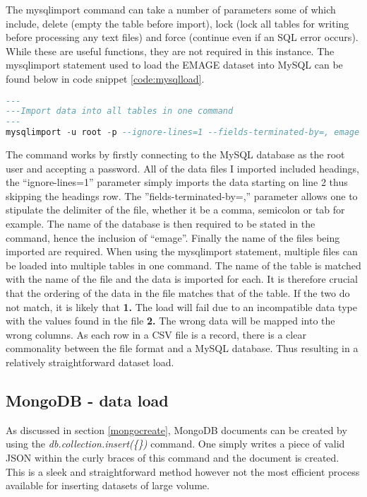 The mysqlimport command can take a number of parameters some of which include, delete (empty the table before import), lock (lock all tables for writing before processing any text files) and force (continue even if an SQL error occurs). While these are useful functions, they are not required in this instance. The mysqlimport statement used to load the EMAGE dataset into MySQL can be found below in code snippet \ref{code:mysqlload}.
\begin{lstlisting}[language=SQL, caption=Command used to load data into the MySQL database., label=code:mysqlload]
---
---Import data into all tables in one command
---
mysqlimport -u root -p --ignore-lines=1 --fields-terminated-by=, emage assays.csv publications.csv sources.csv specimens.csv stages.csv textannotations.csv genes.csv anatomystructures.csv
\end{lstlisting}
\parindent 0pt
The command works by firstly connecting to the MySQL database as the root user and accepting a password. All of the data files I imported included headings, the ``ignore-lines=1'' parameter simply imports the data starting on line 2 thus skipping the headings row. The ''fields-terminated-by=,'' parameter allows one to stipulate the delimiter of the file, whether it be a comma, semicolon or tab for example. The name of the database is then required to be stated in the command, hence the inclusion of ``emage''. Finally the name of the files being imported are required. When using the mysqlimport statement, multiple files can be loaded into multiple tables in one command. The name of the table is matched with the name of the file and the data is imported for each. It is therefore crucial that the ordering of the data in the file matches that of the table. If the two do not match, it is likely that \textbf{1.} The load will fail due to an incompatible data type with the values found in the file \textbf{2.} The wrong data will be mapped into the wrong columns. As each row in a CSV file is a record, there is a clear commonality between the file format and a MySQL database. Thus resulting in a relatively straightforward dataset load.
\parindent 15pt

\subsection{MongoDB - data load}\label{mongoload}
As discussed in section \ref{mongocreate}, MongoDB documents can be created by using the \textit{db.collection.insert(\{\})} command. One simply writes a piece of valid JSON within the curly braces of this command and the document is created. This is a sleek and straightforward method however not the most efficient process available for inserting datasets of large volume.

